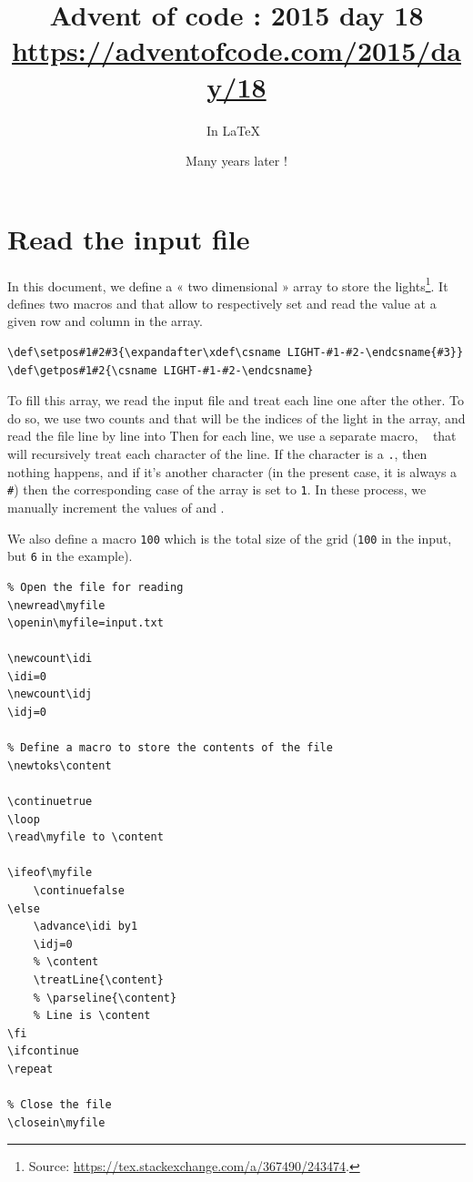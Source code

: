\documentclass{article}
\title{%
    Advent of code : 2015 day 18 \\
    \large
    \url{https://adventofcode.com/2015/day/18}
}
\author{In \LaTeX\ }
\date{Many years later !}
\makeatletter
\providecommand{\mintex}[1]{\texttt{#1}}
\def\size{100}
\def\setpos#1#2#3{\expandafter\xdef\csname LIGHT-#1-#2-\endcsname{#3}}
\def\getpos#1#2{\csname LIGHT-#1-#2-\endcsname}
\def\setbpos#1#2#3{\expandafter\def\csname BACKUP-#1-#2-\endcsname{#3}}
\newif\ifcontinue
\def\treatLine#1{%
  \expandafter\@treatLine#1\relax
}
\def\@treatLine#1{%
    \advance\idj by1
    \ifx\relax#1%
    \else
        \ifx #1.%
            \setbpos{\the\idi}{\the\idj}{0}
            \else
            \setpos{\the\idi}{\the\idj}{1}
            \setbpos{\the\idi}{\the\idj}{1}
        \fi
        \expandafter\@treatLine
    \fi
}
\makeatother
\begin{document}
\maketitle

\section{Read the input file}


In this document, we define a « two dimensional » array to store the lights\footnote{Source: \url{https://tex.stackexchange.com/a/367490/243474}.}.
It defines two macros \mintex{\setpos} and \mintex{\getpos} that allow to respectively set and read the value at a given row and column in the array.

\begin{verbatim}
\def\setpos#1#2#3{\expandafter\xdef\csname LIGHT-#1-#2-\endcsname{#3}}
\def\getpos#1#2{\csname LIGHT-#1-#2-\endcsname}
\end{verbatim}

To fill this array, we read the input file and treat each line one after the other.
To do so, we use two counts \mintex{\idi} and \mintex{\idj} that will be the indices of the light in the array, and read the file line by line into \mintex{\content}
Then for each line, we use a separate macro, \mintex{\treatLine{\content}} that will recursively treat each character of the line.
If the character is a \texttt{.}, then nothing happens, and if it's another character (in the present case, it is always a \texttt{\#}) then the corresponding case of the array is set to \texttt{1}.
In these process, we manually increment the values of \mintex{\idi} and \mintex{\idj}.

We also define a macro \mintex{\size} which is the total size of the grid (\texttt{100} in the input, but \texttt{6} in the example).

\begin{verbatim}
% Open the file for reading
\newread\myfile
\openin\myfile=input.txt

\newcount\idi
\idi=0
\newcount\idj
\idj=0

% Define a macro to store the contents of the file
\newtoks\content

\continuetrue
\loop
\read\myfile to \content

\ifeof\myfile
    \continuefalse
\else
    \advance\idi by1
    \idj=0
    % \content
    \treatLine{\content}
    % \parseline{\content}
    % Line is \content
\fi
\ifcontinue
\repeat

% Close the file
\closein\myfile
\end{verbatim}
\end{document}
